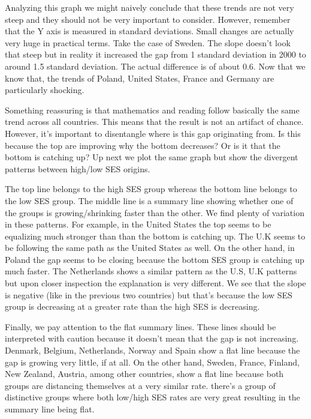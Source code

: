 \documentclass[11pt, a4paper]{article}\usepackage[]{graphicx}\usepackage[]{color}
\begin{document}
Analyzing this graph we might naively conclude that these trends are not very steep and they should not be very important to consider. However, remember that the Y axis is measured in standard deviations. Small changes are actually very huge in practical terms. Take the case of Sweden. The slope doesn't look that steep but in reality it increased the gap from 1 standard deviation in 2000 to around 1.5 standard deviation. The actual difference is of about 0.6. Now that we know that, the trends of Poland, United States, France and Germany are particularly shocking.

Something reassuring is that mathematics and reading follow basically the same trend across all countries. This means that the result is not an artifact of chance. However, it's important to disentangle where is this gap originating from. Is this because the top are improving why the bottom decreases? Or is it that the bottom is catching up? Up next we plot the same graph but show the divergent patterns between high/low SES origins.




The top line belongs to the high SES group whereas the bottom line belongs to the low SES group. The middle line is a summary line showing whether one of the groups is growing/shrinking faster than the other. We find plenty of variation in these patterns. For example, in the United States the top seems to be equalizing much stronger than than the bottom is catching up. The U.K seems to be following the same path as the United States as well. On the other hand, in Poland the gap seems to be closing because the bottom SES group is catching up much faster. The Netherlands shows a similar pattern as the U.S, U.K patterns but upon closer inspection the explanation is very different. We see that the slope is negative (like in the previous two countries) but that's because the low SES group is decreasing at a greater rate than the high SES is decreasing.

Finally, we pay attention to the flat summary lines. These lines should be interpreted with caution because it doesn't mean that the gap is not increasing. Denmark, Belgium, Netherlands, Norway and Spain show a flat line because the gap is growing very little, if at all. On the other hand, Sweden, France, Finland, New Zealand, Austria, among other countries, show a flat line because both groups are distancing themselves at a very similar rate. there's a group of distinctive groups where both low/high SES rates are very great resulting in the summary line being flat.
\end{document}
